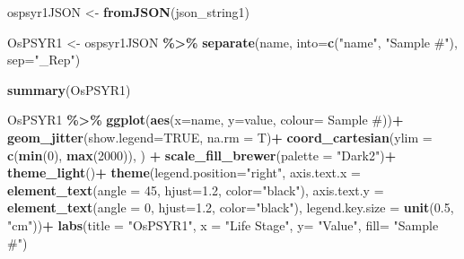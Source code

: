 \documentclass[
]{article}
\newenvironment{Shaded}{\begin{snugshade}}{\end{snugshade}}
\newcommand{\AttributeTok}[1]{\textcolor[rgb]{0.13,0.29,0.53}{#1}}
\newcommand{\ConstantTok}[1]{\textcolor[rgb]{0.56,0.35,0.01}{#1}}
\newcommand{\DecValTok}[1]{\textcolor[rgb]{0.00,0.00,0.81}{#1}}
\newcommand{\FloatTok}[1]{\textcolor[rgb]{0.00,0.00,0.81}{#1}}
\newcommand{\FunctionTok}[1]{\textcolor[rgb]{0.13,0.29,0.53}{\textbf{#1}}}
\newcommand{\NormalTok}[1]{#1}
\newcommand{\OtherTok}[1]{\textcolor[rgb]{0.56,0.35,0.01}{#1}}
\newcommand{\SpecialCharTok}[1]{\textcolor[rgb]{0.81,0.36,0.00}{\textbf{#1}}}
\newcommand{\StringTok}[1]{\textcolor[rgb]{0.31,0.60,0.02}{#1}}
\begin{document}
\begin{Shaded}
\begin{Highlighting}[]
\NormalTok{ospsyr1JSON }\OtherTok{\textless{}{-}} \FunctionTok{fromJSON}\NormalTok{(json\_string1)}
\end{Highlighting}
\end{Shaded}

\begin{Shaded}
\begin{Highlighting}[]
\NormalTok{OsPSYR1 }\OtherTok{\textless{}{-}}\NormalTok{ ospsyr1JSON }\SpecialCharTok{\%\textgreater{}\%} 
  \FunctionTok{separate}\NormalTok{(name, }\AttributeTok{into=}\FunctionTok{c}\NormalTok{(}\StringTok{"name"}\NormalTok{, }\StringTok{"Sample \#"}\NormalTok{), }\AttributeTok{sep=}\StringTok{"\_Rep"}\NormalTok{) }
\end{Highlighting}
\end{Shaded}

\begin{Shaded}
\begin{Highlighting}[]
\FunctionTok{summary}\NormalTok{(OsPSYR1)}
\end{Highlighting}
\end{Shaded}

\begin{Shaded}
\begin{Highlighting}[]
\NormalTok{ OsPSYR1 }\SpecialCharTok{\%\textgreater{}\%} 
  \FunctionTok{ggplot}\NormalTok{(}\FunctionTok{aes}\NormalTok{(}\AttributeTok{x=}\NormalTok{name, }\AttributeTok{y=}\NormalTok{value, }\AttributeTok{colour=} \StringTok{\textasciigrave{}}\AttributeTok{Sample \#}\StringTok{\textasciigrave{}}\NormalTok{))}\SpecialCharTok{+}
  \FunctionTok{geom\_jitter}\NormalTok{(}\AttributeTok{show.legend=}\ConstantTok{TRUE}\NormalTok{, }\AttributeTok{na.rm =}\NormalTok{ T)}\SpecialCharTok{+}
  \FunctionTok{coord\_cartesian}\NormalTok{(}\AttributeTok{ylim =} \FunctionTok{c}\NormalTok{(}\FunctionTok{min}\NormalTok{(}\DecValTok{0}\NormalTok{), }\FunctionTok{max}\NormalTok{(}\DecValTok{2000}\NormalTok{)), ) }\SpecialCharTok{+}
  \FunctionTok{scale\_fill\_brewer}\NormalTok{(}\AttributeTok{palette =} \StringTok{"Dark2"}\NormalTok{)}\SpecialCharTok{+}
  \FunctionTok{theme\_light}\NormalTok{()}\SpecialCharTok{+}
  \FunctionTok{theme}\NormalTok{(}\AttributeTok{legend.position=}\StringTok{"right"}\NormalTok{, }
        \AttributeTok{axis.text.x =} \FunctionTok{element\_text}\NormalTok{(}\AttributeTok{angle =} \DecValTok{45}\NormalTok{, }\AttributeTok{hjust=}\FloatTok{1.2}\NormalTok{, }\AttributeTok{color=}\StringTok{"black"}\NormalTok{), }
        \AttributeTok{axis.text.y =} \FunctionTok{element\_text}\NormalTok{(}\AttributeTok{angle =} \DecValTok{0}\NormalTok{, }\AttributeTok{hjust=}\FloatTok{1.2}\NormalTok{, }\AttributeTok{color=}\StringTok{"black"}\NormalTok{), }
        \AttributeTok{legend.key.size =} \FunctionTok{unit}\NormalTok{(}\FloatTok{0.5}\NormalTok{, }\StringTok{"cm"}\NormalTok{))}\SpecialCharTok{+}
  \FunctionTok{labs}\NormalTok{(}\AttributeTok{title =} \StringTok{"OsPSYR1"}\NormalTok{,}
       \AttributeTok{x =} \StringTok{"Life Stage"}\NormalTok{,}
       \AttributeTok{y=} \StringTok{"Value"}\NormalTok{,}
       \AttributeTok{fill=} \StringTok{"Sample \#"}\NormalTok{)}
\end{Highlighting}
\end{Shaded}
\end{document}
